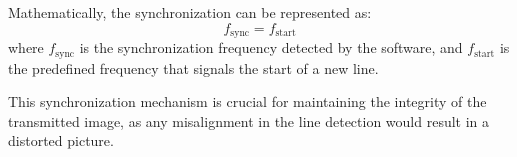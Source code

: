Mathematically, the synchronization can be represented as:
\[
f_{\text{sync}} = f_{\text{start}}
\]
where \( f_{\text{sync}} \) is the synchronization frequency detected by the software, and \( f_{\text{start}} \) is the predefined frequency that signals the start of a new line.

This synchronization mechanism is crucial for maintaining the integrity of the transmitted image, as any misalignment in the line detection would result in a distorted picture.

